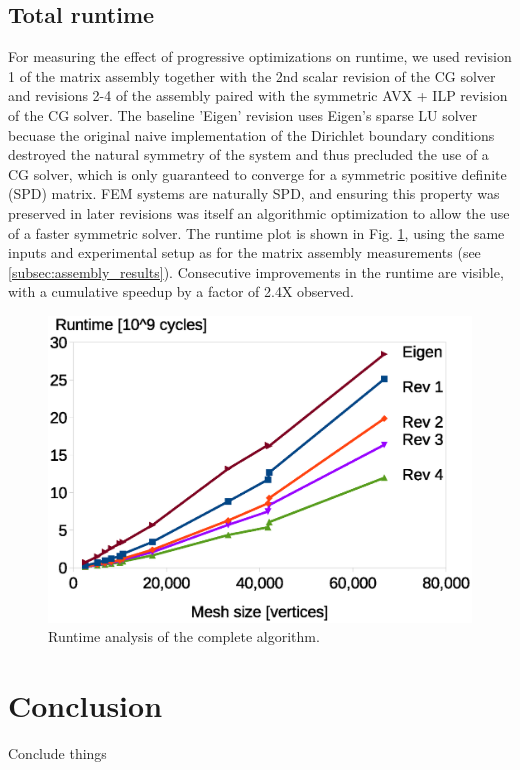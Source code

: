 \documentclass[letterpaper]{article}
\begin{document}
\subsection{Total runtime}
For measuring the effect of progressive optimizations on runtime, we used revision 1 of the matrix assembly together with the 2nd scalar revision of the CG solver and revisions 2-4 of the assembly paired with the symmetric AVX + ILP revision of the CG solver.
The baseline 'Eigen' revision uses Eigen's sparse LU solver becuase the original naive implementation of the Dirichlet boundary conditions destroyed the natural symmetry of the system and thus precluded the use of a CG solver, which is only guaranteed to converge for a symmetric positive definite (SPD) matrix. FEM systems are naturally SPD, and ensuring this property was preserved in later revisions was itself an algorithmic optimization to allow the use of a faster symmetric solver.
The runtime plot is shown in Fig. \ref{fig:runtime_total}, using the same inputs and experimental setup as for the matrix assembly measurements (see \ref{subsec:assembly_results}). Consecutive improvements in the runtime are visible, with a cumulative speedup by a factor of 2.4X observed.
\begin{figure}[H]\centering
  \includegraphics[width=\linewidth]{./plots/total_runtime.eps}
  \caption{Runtime analysis of the complete algorithm.}
  \label{fig:runtime_total}
\end{figure}


\section{Conclusion}
Conclude things



\begin{thebibliography}{99}



\end{thebibliography}
\end{document}
